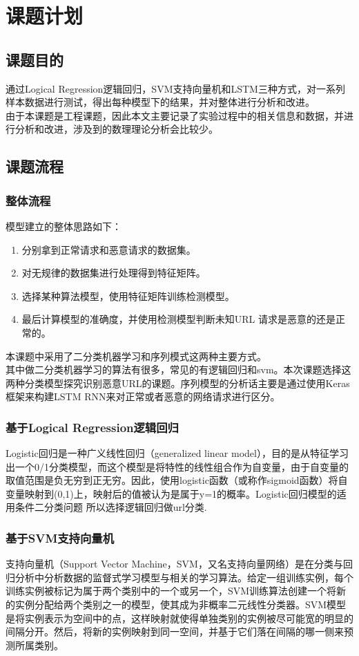 \section{课题计划}
\subsection{课题目的}
通过Logical Regression逻辑回归，SVM支持向量机和LSTM三种方式，对一系列样本数据进行测试，得出每种模型下的结果，并对整体进行分析和改进。
\\\indent{}由于本课题是工程课题，因此本文主要记录了实验过程中的相关信息和数据，并进行分析和改进，涉及到的数理理论分析会比较少。
\subsection{课题流程}
\subsubsection{整体流程}
模型建立的整体思路如下： 
\begin{enumerate}
    \item 分别拿到正常请求和恶意请求的数据集。 
    \item 对无规律的数据集进行处理得到特征矩阵。 
    \item 选择某种算法模型，使用特征矩阵训练检测模型。
    \item 最后计算模型的准确度，并使用检测模型判断未知URL 请求是恶意的还是正常的。
\end{enumerate}
本课题中采用了二分类机器学习和序列模式这两种主要方式。
\\\indent{}其中做二分类机器学习的算法有很多，常见的有逻辑回归和svm。本次课题选择这两种分类模型探究识别恶意URL的课题。序列模型的分析话主要是通过使用Keras框架来构建LSTM RNN来对正常或者恶意的网络请求进行区分。
\subsubsection{基于Logical Regression逻辑回归}
Logistic回归是一种广义线性回归（generalized linear model），目的是从特征学习出一个0/1分类模型，而这个模型是将特性的线性组合作为自变量，由于自变量的取值范围是负无穷到正无穷。因此，使用logistic函数（或称作sigmoid函数）将自变量映射到(0,1)上，映射后的值被认为是属于y=1的概率。Logistic回归模型的适用条件二分类问题 所以选择逻辑回归做url分类.
\subsubsection{基于SVM支持向量机}
支持向量机（Support Vector Machine，SVM，又名支持向量网络）是在分类与回归分析中分析数据的监督式学习模型与相关的学习算法。给定一组训练实例，每个训练实例被标记为属于两个类别中的一个或另一个，SVM训练算法创建一个将新的实例分配给两个类别之一的模型，使其成为非概率二元线性分类器。SVM模型是将实例表示为空间中的点，这样映射就使得单独类别的实例被尽可能宽的明显的间隔分开。然后，将新的实例映射到同一空间，并基于它们落在间隔的哪一侧来预测所属类别。
